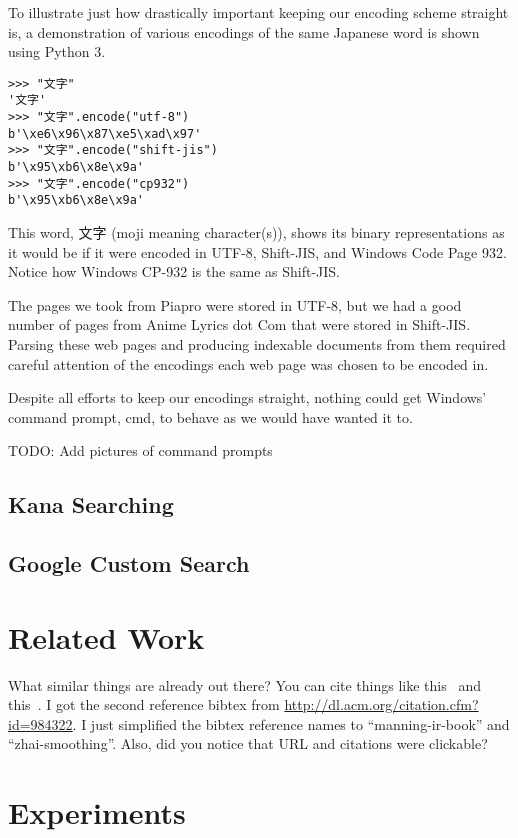 \documentclass{acm} %
\begin{document}
\begin{CJK}{UTF8}{zhsong}
To illustrate just how drastically important keeping our encoding scheme straight is, a demonstration of various encodings of the same Japanese word is shown using Python 3.

\begin{verbatim}
>>> "文字"
'文字'
>>> "文字".encode("utf-8")
b'\xe6\x96\x87\xe5\xad\x97'
>>> "文字".encode("shift-jis")
b'\x95\xb6\x8e\x9a'
>>> "文字".encode("cp932")
b'\x95\xb6\x8e\x9a'
\end{verbatim}

This word, 文字 (moji meaning character(s)), shows its binary representations as it would be if it were encoded in UTF-8, Shift-JIS, and Windows Code Page 932. Notice how Windows CP-932 is the same as Shift-JIS.

The pages we took from Piapro were stored in UTF-8, but we had a good number of pages from Anime Lyrics dot Com that were stored in Shift-JIS. Parsing these web pages and producing indexable documents from them required careful attention of the encodings each web page was chosen to be encoded in.

Despite all efforts to keep our encodings straight, nothing could get Windows' command prompt, cmd, to behave as we would have wanted it to.

TODO: Add pictures of command prompts

\subsection{Kana Searching}

\subsection{Google Custom Search}

\section{Related Work}

What similar things are already out there? You can cite things like
this~\cite{manning-ir-book} and this~\cite{zhai-smoothing}. I got the second
reference bibtex from \url{http://dl.acm.org/citation.cfm?id=984322}. I just
simplified the bibtex reference names to ``manning-ir-book'' and
``zhai-smoothing''. Also, did you notice that URL and citations were clickable?

\section{Experiments}


\end{CJK}
\end{document}
